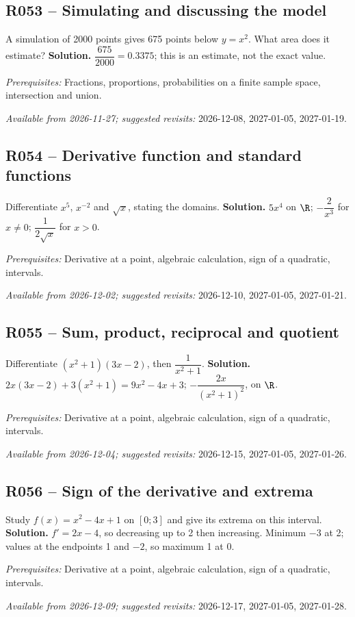 \subsection*{R053 -- Simulating and discussing the model}\label{R053}
A simulation of 2000 points gives 675 points below $y=x^2$. What area does it estimate?
\ifprof\textbf{Solution.} $\dfrac{675}{2000}=0.3375$; this is an estimate, not the exact value.\par\textit{Prerequisites:} Fractions, proportions, probabilities on a finite sample space, intersection and union.\par\textit{Available from 2026-11-27; suggested revisits:} 2026-12-08, 2027-01-05, 2027-01-19.\fi
{}\subsection*{R054 -- Derivative function and standard functions}\label{R054}
Differentiate $x^5$, $x^{-2}$ and $\sqrt x$, stating the domains.
\ifprof\textbf{Solution.} $5x^4$ on $\R$; $-\dfrac{2}{x^3}$ for $x\ne0$; $\dfrac{1}{2\sqrt x}$ for $x>0$.\par\textit{Prerequisites:} Derivative at a point, algebraic calculation, sign of a quadratic, intervals.\par\textit{Available from 2026-12-02; suggested revisits:} 2026-12-10, 2027-01-05, 2027-01-21.\fi
{}\subsection*{R055 -- Sum, product, reciprocal and quotient}\label{R055}
Differentiate $(x^2+1)(3x-2)$, then $\dfrac{1}{x^2+1}$.
\ifprof\textbf{Solution.} $2x(3x-2)+3(x^2+1)=9x^2-4x+3$; $-\dfrac{2x}{(x^2+1)^2}$, on $\R$.\par\textit{Prerequisites:} Derivative at a point, algebraic calculation, sign of a quadratic, intervals.\par\textit{Available from 2026-12-04; suggested revisits:} 2026-12-15, 2027-01-05, 2027-01-26.\fi
{}\subsection*{R056 -- Sign of the derivative and extrema}\label{R056}
Study $f(x)=x^2-4x+1$ on $[0;3]$ and give its extrema on this interval.
\ifprof\textbf{Solution.} $f\prime=2x-4$, so decreasing up to 2 then increasing. Minimum $-3$ at 2; values at the endpoints 1 and $-2$, so maximum 1 at 0.\par\textit{Prerequisites:} Derivative at a point, algebraic calculation, sign of a quadratic, intervals.\par\textit{Available from 2026-12-09; suggested revisits:} 2026-12-17, 2027-01-05, 2027-01-28.\fi
